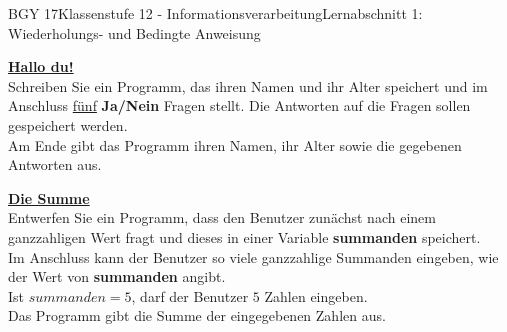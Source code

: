 \documentclass[oneside,openany,headings=optiontotoc,11pt,numbers=noenddot]{scrreprt}
\begin{document}
\begin{worksheet}{BGY 17}{Klassenstufe 12 - Informationsverarbeitung}{Lernabschnitt 1: Wiederholungs- und Bedingte Anweisung}
\begin{framed}
			\textbf{\underline{Hallo du!}}\\
			Schreiben Sie ein Programm, das ihren Namen und ihr Alter speichert und im Anschluss \underline{fünf} \textbf{Ja/Nein} Fragen stellt. Die Antworten auf die Fragen sollen gespeichert werden.\\
			Am Ende gibt das Programm ihren Namen, ihr Alter sowie die gegebenen Antworten aus.
			\par\bigskip\noindent
			\textbf{\underline{Die Summe}}\\
			Entwerfen Sie ein Programm, dass den Benutzer zunächst nach einem ganzzahligen Wert fragt und dieses in einer Variable \textbf{summanden} speichert.\\
			Im Anschluss kann der Benutzer so viele ganzzahlige Summanden eingeben, wie der Wert von \textbf{summanden} angibt.\\
			\tiny{Ist \(summanden = 5\), darf der Benutzer \(5\) Zahlen eingeben.}\normalsize\\
			Das Programm gibt die Summe der eingegebenen Zahlen aus.\\
			\par\noindent
		\end{framed}
	\end{worksheet}
\end{document}
